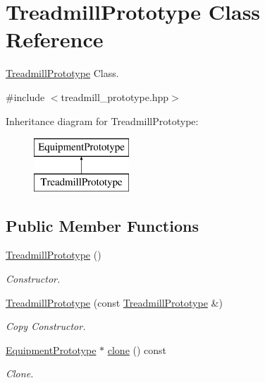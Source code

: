 \hypertarget{class_treadmill_prototype}{}\section{Treadmill\+Prototype Class Reference}
\label{class_treadmill_prototype}


\hyperlink{class_treadmill_prototype}{Treadmill\+Prototype} Class.  




{\ttfamily \#include $<$treadmill\+\_\+prototype.\+hpp$>$}

Inheritance diagram for Treadmill\+Prototype\+:\begin{figure}[H]
\begin{center}
\leavevmode
\includegraphics[height=2.000000cm]{class_treadmill_prototype}
\end{center}
\end{figure}
\subsection*{Public Member Functions}
\begin{DoxyCompactItemize}
\item 
\hypertarget{class_treadmill_prototype_af0689fe2a2c25382690f38e7926d5721}{}\hyperlink{class_treadmill_prototype_af0689fe2a2c25382690f38e7926d5721}{Treadmill\+Prototype} ()\label{class_treadmill_prototype_af0689fe2a2c25382690f38e7926d5721}

\begin{DoxyCompactList}\small\item\em Constructor. \end{DoxyCompactList}\item 
\hypertarget{class_treadmill_prototype_aa26e5b7c3dcf15d9c7fc59e621f77e5c}{}\hyperlink{class_treadmill_prototype_aa26e5b7c3dcf15d9c7fc59e621f77e5c}{Treadmill\+Prototype} (const \hyperlink{class_treadmill_prototype}{Treadmill\+Prototype} \&)\label{class_treadmill_prototype_aa26e5b7c3dcf15d9c7fc59e621f77e5c}

\begin{DoxyCompactList}\small\item\em Copy Constructor. \end{DoxyCompactList}\item 
\hyperlink{class_equipment_prototype}{Equipment\+Prototype} $\ast$ \hyperlink{class_treadmill_prototype_abd7e7f894721af9f03b248b6617d4fdc}{clone} () const 
\begin{DoxyCompactList}\small\item\em Clone. \end{DoxyCompactList}\end{DoxyCompactItemize}
